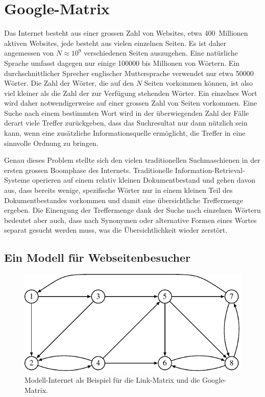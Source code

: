 %
%
%
\section{Google-Matrix
\label{buch:section:google-matrix}}
Das Internet besteht aus einer grossen Zahl von Websites, etwa 400~Millionen
aktiven Websites, jede besteht aus vielen einzelnen Seiten.
%
Es ist daher angemessen von $N\approx 10^9$ verschiedenen Seiten auszugehen.
Eine natürliche Sprache umfasst dagegen nur einige 100000 bis Millionen
von Wörtern.
Ein durchschnittlicher Sprecher englischer Muttersprache verwendet nur etwa
50000 Wörter.
Die Zahl der Wörter, die auf den $N$ Seiten vorkommen können, ist also
viel kleiner als die Zahl der zur Verfügung stehenden Wörter.
Ein einzelnes Wort wird daher notwendigerweise auf einer grossen Zahl
von Seiten vorkommen.
Eine Suche nach einem bestimmten Wort wird in der überwiegenden Zahl
der Fälle derart viele Treffer zurückgeben, dass das Suchresultat
nur dann nützlich sein kann, wenn eine zusätzliche Informationsquelle
ermöglicht, die Treffer in eine sinnvolle Ordnung zu bringen.

Genau dieses Problem stellte sich den vielen traditionellen Suchmaschienen
in der ersten grossen Boomphase des Internets.
Traditionelle Information-Retrieval-Systeme operieren auf einem relativ
%
kleinen Dokumentbestand und gehen davon aus, dass bereits wenige, spezifische
Wörter nur in einem kleinen Teil des Dokumentbestandes vorkommen und damit
eine übersichtliche Treffermenge ergeben.
Die Einengung der Treffermenge dank der Suche nach einzelnen Wörtern
bedeutet aber auch, dass nach Synonymen oder alternative Formen eines
Wortes separat gesucht werden muss, was die Übersichtlichkeit wieder
zerstört.
%

%
%
\subsection{Ein Modell für Webseitenbesucher
\label{buch:subsection:modell-fuer-webseitenbesucher}}
\begin{figure}
\centering
\includegraphics{chapters/80-wahrscheinlichkeit/images/internet.pdf}
\caption{Modell-Internet als Beispiel für die Link-Matrix und die Google-Matrix.
\label{buch:figure:modellinternet}}
\end{figure}

